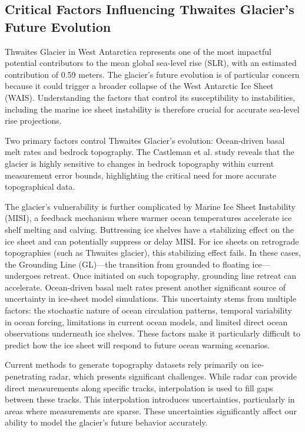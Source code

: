\subsection*{Critical Factors Influencing Thwaites Glacier's Future Evolution}

Thwaites Glacier in West Antarctica represents one of the most impactful potential contributors to the mean global sea-level rise (SLR), with an estimated contribution of 0.59 meters\cite{Holt_2006}. The glacier's future evolution is of particular concern because it could trigger a broader collapse of the West Antarctic Ice Sheet (WAIS)\cite{Holt_2006, Castleman_2022}. Understanding the factors that control its susceptibility to instabilities, including the marine ice sheet instability is therefore crucial for accurate sea-level rise projections\cite{Castleman_2022}.

Two primary factors control Thwaites Glacier's evolution: Ocean-driven basal melt rates and bedrock topography\cite{Castleman_2022}. The Castleman et al.\cite{Castleman_2022} study reveals that the glacier is highly sensitive to changes in bedrock topography within current measurement error bounds, highlighting the critical need for more accurate topographical data.

The glacier's vulnerability is further complicated by Marine Ice Sheet Instability (MISI)\cite{Castleman_2022}, a feedback mechanism where warmer ocean temperatures accelerate ice shelf melting and calving. Buttressing ice shelves have a stabilizing effect on the ice sheet and can potentially suppress or delay MISI\cite{Wernecke_2022}. For ice sheets on retrograde topographies (such as Thwaites glacier), this stabilizing effect fails. In these cases, the Grounding Line (GL)—the transition from grounded to floating ice—undergoes retreat. Once initiated on such topography, grounding line retreat can accelerate\cite{Castleman_2022}.
Ocean-driven basal melt rates present another significant source of uncertainty in ice-sheet model simulations. This uncertainty stems from multiple factors\cite{Castleman_2022}: the stochastic nature of ocean circulation patterns, temporal variability in ocean forcing, limitations in current ocean models, and limited direct ocean observations underneath ice shelves. These factors make it particularly difficult to predict how the ice sheet will respond to future ocean warming scenarios\cite{Castleman_2022}.

Current methods to generate topography datasets rely primarily on ice-penetrating radar, which presents significant challenges. While radar can provide direct measurements along specific tracks, interpolation is used to fill gaps between these tracks. This interpolation introduces uncertainties, particularly in areas where measurements are sparse. These uncertainties significantly affect our ability to model the glacier's future behavior accurately.

